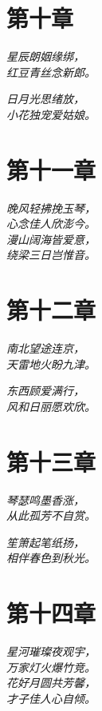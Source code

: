 \documentclass[12pt, a4paper, oneside]{book}
\newenvironment{poem}
  {\vspace{1em}\begin{flushleft}\itshape}
  {\end{flushleft}\vspace{1em}}
\begin{document}
\chapter{第十章}
\begin{poem}
星辰朗姻缘绑，\\
红豆青丝念新郎。\\
\end{poem}
\begin{poem}
日月光思绪放，\\
小花独宠爱姑娘。\\
\end{poem}

\chapter{第十一章}
\begin{poem}
晚风轻拂挽玉琴，\\
心念佳人欣澎今。\\
漫山阔海皆爱意，\\
绕梁三日岂惟音。\\
\end{poem}

\chapter{第十二章}
\begin{poem}
南北望途连京，\\
天雷地火盼九津。\\
\end{poem}
\begin{poem}
东西顾爱满行，\\
风和日丽愿欢欣。\\
\end{poem}

\chapter{第十三章}
\begin{poem}
琴瑟鸣墨香涨，\\
从此孤芳不自赏。\\
\end{poem}
\begin{poem}
笙箫起笔纸扬，\\
相伴春色到秋光。\\
\end{poem}

\chapter{第十四章}
\begin{poem}
星河璀璨夜观宇，\\
万家灯火爆竹竞。\\
花好月圆共芳馨，\\
才子佳人心自倾。\\
\end{poem}
\end{document}
